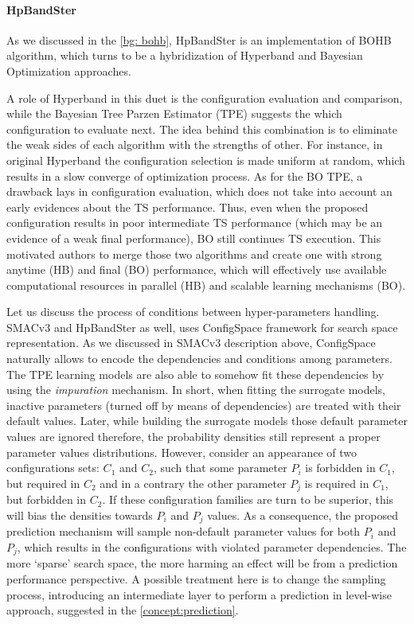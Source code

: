 \paragraph{HpBandSter}
As we discussed in the \cref{bg: bohb}, HpBandSter is an implementation of BOHB algorithm, which turns to be a hybridization of Hyperband and Bayesian Optimization approaches.

A role of Hyperband in this duet is the configuration evaluation and comparison, while the Bayesian Tree Parzen Estimator (TPE) suggests the which configuration to evaluate next. The idea behind this combination is to eliminate the weak sides of each algorithm with the strengths of other. For instance, in original Hyperband the configuration selection is made uniform at random, which results in a slow converge of optimization process. As for the BO TPE, a drawback lays in configuration evaluation, which does not take into account an early evidences about the TS performance. Thus, even when the proposed configuration results in poor intermediate TS performance (which may be an evidence of a weak final performance), BO still continues TS execution. This motivated authors to merge those two algorithms and create one with strong anytime (HB) and final (BO) performance, which will effectively use available computational resources in parallel (HB) and scalable learning mechanisms (BO).

Let us discuss the process of conditions between hyper-parameters handling. SMACv3 and HpBandSter as well, uses ConfigSpace framework for search space representation. As we discussed in SMACv3 description above, ConfigSpace naturally allows to encode the dependencies and conditions among parameters. The TPE learning models are also able to somehow fit these dependencies by using the \emph{impuration} mechanism\cite{levesque2017bayesian}. In short, when fitting the surrogate models, inactive parameters (turned off by means of dependencies) are treated with their default values. Later, while building the surrogate models those default parameter values are ignored therefore, the probability densities still represent a proper parameter values distributions. However, consider an appearance of two configurations sets: $C_1$ and $C_2$, such that some parameter $P_i$ is forbidden in $C_1$, but required in $C_2$ and in a contrary the other parameter $P_j$ is required in $C_1$, but forbidden in $C_2$. If these configuration families are turn to be superior, this will bias the densities towards $P_i$ and $P_j$ values. As a consequence, the proposed prediction mechanism will sample non-default parameter values for both $P_i$ and $P_j$, which results in the configurations with violated parameter dependencies. The more `sparse' search space, the more harming an effect will be from a prediction performance perspective. A possible treatment here is to change the sampling process, introducing an intermediate layer to perform a prediction in level-wise approach, suggested in the \cref{concept:prediction}.


